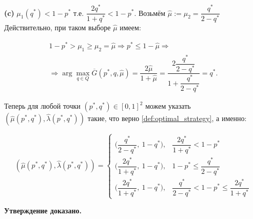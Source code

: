 \textbf{(c)} 
$\mu_1(q^*) < 1 - p^*$ т.е. $\dfrac{2 q^*}{1 + q^*} < 1 - p^*$.
Возьмём $\hat \mu := \mu_2 = \dfrac{q^*}{2 - q^*}$
Действительно, при таком выборе $\hat \mu$ имеем:

\begin{gather*}
	1 - p^* > \mu_1 \geqslant \mu_2 = \hat \mu \Rightarrow
	p^* \leqslant 1 - \hat \mu \Rightarrow 
	\\	
	\Rightarrow \arg \max \limits_{q \in Q} \overline G(p^*, q, \hat \mu) =
	\dfrac{2 \hat \mu}{1 + \hat \mu} =
	\dfrac{2 \dfrac{q^*}{2 - q^*}}{1 + \dfrac{q^*}{2 - q^*}} =
	q^*.
\end{gather*}

Теперь для любой точки $(p^*,q^*) \in [0,1]^2$ можем указать
$(\hat \mu(p^*,q^*), \hat \lambda(p^*,q^*))$ такие, что верно \eqref{def:optimal_strategy},
а именно:
 
$$
(\hat \mu(p^*,q^*), \hat \lambda(p^*,q^*)) = 
\begin{cases}
	\Big(\dfrac{q^*}{2 - q^*}, \: 1 - q^* \Big), &
	\dfrac{2 q^*}{1 + q^*} < 1 - p^*
	\\
	\Big(\dfrac{2 q^*}{1 + q^*}, \: 1 - q^* \Big), &
	1 - p^* \leqslant \dfrac{q^*}{2 - q^*}
	\\
	\Big(\dfrac{2 q^*}{1 + q^*}, \: 1 - q^*\Big), & 	
	\dfrac{q^*}{2 - q^{*}} < 1 - p^* \leqslant \dfrac{2 q^*}{1 + q^*}
\end{cases}
$$

\textbf{Утверждение доказано.}